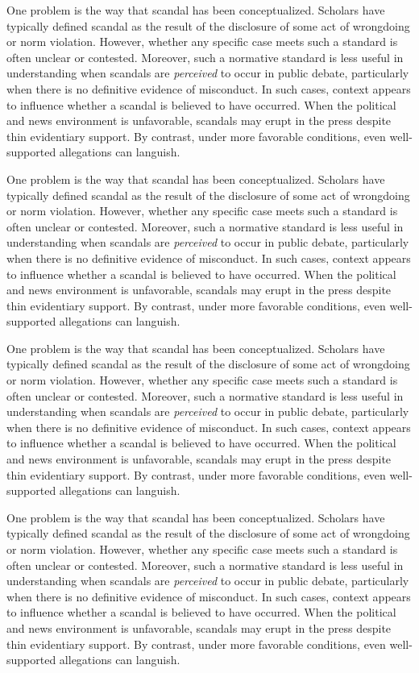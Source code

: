 \documentclass{cupjournal}
\begin{document}
One problem is the way that scandal has been conceptualized. Scholars have typically defined scandal as the result of the disclosure of some act of wrongdoing or norm violation. However, whether any specific case meets such a standard is often unclear or contested. Moreover, such a normative standard is less useful in understanding when scandals are \emph{perceived} to occur in public debate, particularly when there is no definitive evidence of misconduct. In such cases, context appears to influence whether a scandal is believed to have occurred. When the political and news environment is unfavorable, scandals may erupt in the press despite thin evidentiary support. By contrast, under more favorable conditions, even well-supported allegations can languish.

One problem is the way that scandal has been conceptualized. Scholars have typically defined scandal as the result of the disclosure of some act of wrongdoing or norm violation. However, whether any specific case meets such a standard is often unclear or contested. Moreover, such a normative standard is less useful in understanding when scandals are \emph{perceived} to occur in public debate, particularly when there is no definitive evidence of misconduct. In such cases, context appears to influence whether a scandal is believed to have occurred. When the political and news environment is unfavorable, scandals may erupt in the press despite thin evidentiary support. By contrast, under more favorable conditions, even well-supported allegations can languish.

One problem is the way that scandal has been conceptualized. Scholars have typically defined scandal as the result of the disclosure of some act of wrongdoing or norm violation. However, whether any specific case meets such a standard is often unclear or contested. Moreover, such a normative standard is less useful in understanding when scandals are \emph{perceived} to occur in public debate, particularly when there is no definitive evidence of misconduct. In such cases, context appears to influence whether a scandal is believed to have occurred. When the political and news environment is unfavorable, scandals may erupt in the press despite thin evidentiary support. By contrast, under more favorable conditions, even well-supported allegations can languish.

One problem is the way that scandal has been conceptualized. Scholars have typically defined scandal as the result of the disclosure of some act of wrongdoing or norm violation. However, whether any specific case meets such a standard is often unclear or contested. Moreover, such a normative standard is less useful in understanding when scandals are \emph{perceived} to occur in public debate, particularly when there is no definitive evidence of misconduct. In such cases, context appears to influence whether a scandal is believed to have occurred. When the political and news environment is unfavorable, scandals may erupt in the press despite thin evidentiary support. By contrast, under more favorable conditions, even well-supported allegations can languish.
\end{document}
